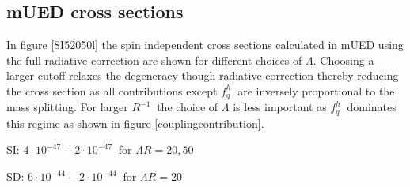 \documentclass{article}
\begin{document}
\subsection{mUED cross sections}
In figure \ref{SI52050l} the spin independent cross sections calculated in mUED  using the full radiative correction are shown for different choices of $\Lambda$. Choosing a larger cutoff relaxes the degeneracy though radiative correction thereby reducing the cross section as all contributions except $f_q^h \ $ are inversely proportional to the mass splitting. For larger $R^{-1} \ $ the choice of $\Lambda$ is less important as $f_q^h \ $ dominates this regime as shown in figure \ref{couplingcontribution}. 


SI: $4\cdot10^{-47}-2\cdot10^{-47} \ $ for $\Lambda R=20,50$ 

SD: $6\cdot10^{-44}-2\cdot10^{-44} \ $ for $\Lambda R=20$
\end{document}
